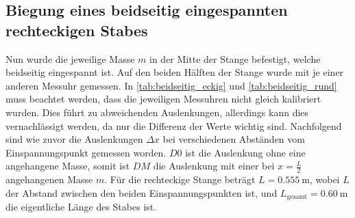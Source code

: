 \FloatBarrier
\subsection{Biegung eines beidseitig eingespannten rechteckigen Stabes}
\label{sec:Biegung eines beidseitig eingespannten rechteckigen Stabes}

Nun wurde die jeweilige Masse $m$ in der Mitte der Stange befestigt, welche beidseitig eingespannt ist.
Auf den beiden Hälften der Stange wurde mit je einer anderen Messuhr gemessen.
In \autoref{tab:beidseitig_eckig} und \autoref{tab:beidseitig_rund} muss beachtet werden, dass die jeweiligen Messuhren nicht gleich kalibriert wurden. 
Dies führt zu abweichenden Auslenkungen, allerdings kann dies vernachlässigt werden, da nur die Differenz der Werte wichtig sind. 
Nachfolgend sind wie zuvor die Auslenkungen $\Delta x$ bei verschiedenen Abständen vom Einspannungspunkt gemessen worden. $D0$ ist die Auslenkung ohne eine angehangene Masse, somit ist $DM$ die Auslenkung mit einer bei $x=\frac{L}{2}$ angehangenen Masse $m$. 
Für die rechteckige Stange beträgt $L = \SI{0.555}{\meter}$, wobei $L$ der Abstand zwischen den beiden Einspannungspunkten ist, und $L_\text{gesamt} = \SI{0.60}{\meter}$ die eigentliche Länge des Stabes ist.

